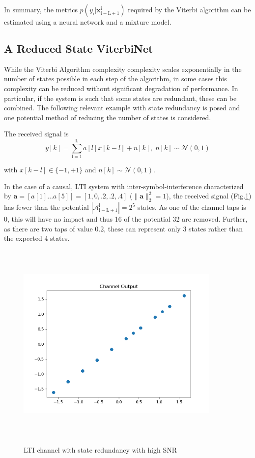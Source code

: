 \documentclass[12pt,a4paper]{report}
\begin{document}
In summary, the metrics $p(y_{\mathrm{i}}|\mathbf{x}_{\mathrm{i-L+1}}^{\mathrm{i}})$ required by the Viterbi algorithm can be estimated using a neural network and a mixture model.





\subsection{A Reduced State ViterbiNet}
While the Viterbi Algorithm complexity complexity scales exponentially in the number of states possible in each step of the algorithm, in some cases this complexity can be reduced without significant degradation of performance. In particular, if the system is such that some states are redundant, these can be combined. The following relevant example with state redundancy is posed and one potential method of reducing the number of states is considered. 

The received signal is
\begin{equation}
y[k] = \sum_{\mathrm{l=1}}^{\mathrm{L}} a[l]x[k-l] + n[k], \; n[k]  \sim \mathcal{N}(0,1)
\end{equation}

with $x[k-l] \in \{ -1, +1\}$ and $n[k]  \sim \mathcal{N}(0,1)$.  

In the case of a causal, LTI system with inter-symbol-interference characterized by $\mathbf{a} = [a[1]...a[5]]=[1, 0, .2, .2, .4]$ ($\|\mathbf{a}\|^2_2 = 1$), the received signal (Fig.\ref{fig:redundant_channel}) has fewer than the potential $|\mathcal{A}_{\mathrm{i-L+1}}^{\mathrm{i}}| =2^5$ states. As one of the channel taps is 0, this will have no impact and thus 16 of the potential 32 are removed. Further, as there are two taps of value 0.2, these can represent only 3 states rather than the expected 4 states. 

\begin{figure}[H]
\centering
	\includegraphics[width=10cm,height = 10cm]{system_model/channel_output}
	  \label{fig:redundant_channel}
	  	  \caption{LTI channel with state redundancy with high SNR}
\end{figure}
\end{document}
